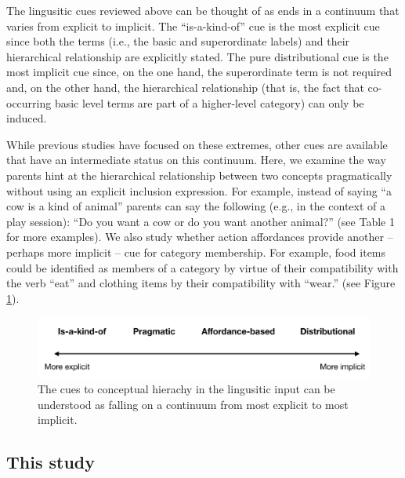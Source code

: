 \documentclass[english,,man,floatsintext]{apa6}
\begin{document}
The lingusitic cues reviewed above can be thought of as ends in a continuum that varies from explicit to implicit. The \enquote{is-a-kind-of} cue is the most explicit cue since both the terms (i.e., the basic and superordinate labels) and their hierarchical relationship are explicitly stated. The pure distributional cue is the most implicit cue since, on the one hand, the superordinate term is not required and, on the other hand, the hierarchical relationship (that is, the fact that co-occurring basic level terms are part of a higher-level category) can only be induced.

While previous studies have focused on these extremes, other cues are available that have an intermediate status on this continuum. Here, we examine the way parents hint at the hierarchical relationship between two concepts pragmatically without using an explicit inclusion expression. For example, instead of saying \enquote{a cow is a kind of animal} parents can say the following (e.g., in the context of a play session): \enquote{Do you want a cow or do you want another animal?} (see Table 1 for more examples). We also study whether action affordances provide another -- perhaps more implicit -- cue for category membership. For example, food items could be identified as members of a category by virtue of their compatibility with the verb \enquote{eat} and clothing items by their compatibility with \enquote{wear.} (see Figure \ref{fig:cues}).

\begin{figure}[h]

{\centering \includegraphics{cogsci_journal_files/figure-latex/cues-1} 

}

\caption{\label{fig:cues} The cues to conceptual hierachy in the lingusitic input can be understood as falling on a continuum from most explicit to most implicit.}\label{fig:cues}
\end{figure}

\hypertarget{this-study}{%
\subsection{This study}\label{this-study}}
\end{document}
